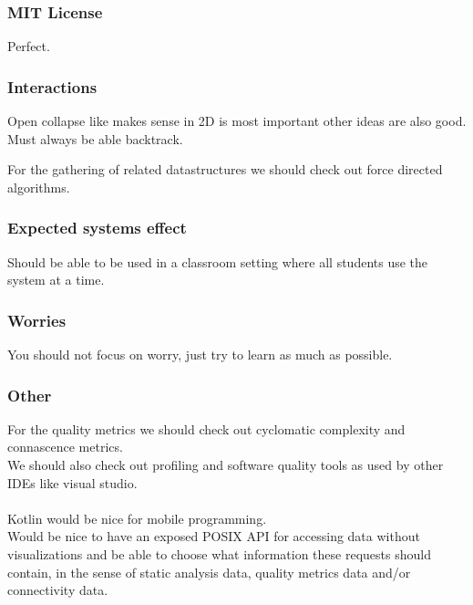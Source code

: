 \subsubsection*{MIT License}

Perfect.

\subsubsection*{Interactions}

Open collapse like makes sense in 2D is most important other ideas are also good. Must always be able backtrack.

For the gathering of related datastructures we should check out force directed algorithms.
\subsubsection*{Expected systems effect}

Should be able to be used in a classroom setting where all students use the system at a time.

\subsubsection*{Worries}

You should not focus on worry, just try to learn as much as possible.

\subsubsection*{Other}

For the quality metrics we should check out cyclomatic complexity and connascence metrics. \\
We should also check out profiling and software quality tools as used by other IDEs like visual studio. 
\\
\\
Kotlin would be nice for mobile programming. \\
Would be nice to have an exposed POSIX API for accessing data without visualizations and be able to choose what information these requests should contain, in the sense of static analysis data, quality metrics data and/or connectivity data.

\newpage